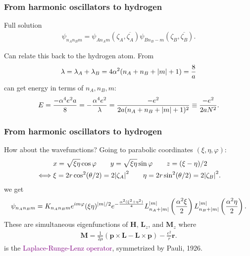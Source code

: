 \documentclass{beamer}
\theoremstyle{definition}
\newcommand{\lp}{\left(}
\newcommand{\rp}{\right)}
\newcommand{\f}[2]{\frac{#1}{#2}}
\newcommand{\al}{\alpha}
\begin{document}
\begin{frame}
\frametitle{From harmonic oscillators to hydrogen}

Full solution
\begin{align*}
\psi_{n_A n_B m} = \psi_{An_A m}\lp \zeta_A, \overline{\zeta_A}\rp \psi_{Bn_B- m}\lp \zeta_B, \overline{\zeta_B} \rp.
\end{align*}

\pause 

Can relate this back to the hydrogen atom. \pause From 
\begin{align*}
\lambda = \lambda_A + \lambda_B =  4\al^2 (n_A + n_B + \abs{m} + 1) = \f{8}{a}
\end{align*}
can get energy in terms of $n_A, n_B, m$:
\begin{align*}
E = \f{-\al^4 e^2 a}{8} = -\f{\al^4 e^2 }{\lambda} = \f{-e^2 }{2a(n_A + n_B + \abs{m} + 1)^2} \equiv \f{-e^2}{2aN^2}.
\end{align*}


\end{frame}



\begin{frame}
\frametitle{From harmonic oscillators to hydrogen}
How about the wavefunctions? 
\pause Going to parabolic coordinates $(\xi, \eta, \varphi)$:
\begin{align*}
&x = \sqrt{\xi\eta}\cos\varphi \quad\quad y = \sqrt{\xi\eta}\sin\varphi \quad\quad z = (\xi - \eta)/2\\
\iff 
&\xi = 2r\cos^2 (\theta/2) = 2\abs{\zeta_A}^2  \quad\quad \eta = 2r\sin^2 (\theta/2) = 2\abs{\zeta_B}^2. 
\end{align*}
\pause
we get
\begin{align*}
\psi_{n_A n_B m} = K_{n_An_B m} e^{im\varphi} (\xi \eta)^{\abs{m}/2}  e^{ -\f{\al^2(\xi^2 + \eta^2)}{4}}
L_{n_A + \abs{m}}^{\abs{m}} \lp\f{\al^2 \xi}{2} \rp
L_{n_B + \abs{m}}^{\abs{m}} \lp\f{\al^2 \eta}{2} \rp.
\end{align*}
\pause 
These are simultaneous eigenfunctions of $\mathbf{H}$, 
\pause $\mathbf{L}_z$, 
\pause and $\mathbf{M}_z$ where
\begin{align*}
\mathbf{M} = \f{1}{2\mu} (\mathbf{p}\times \mathbf{L} - \mathbf{L}\times \mathbf{p}) - \f{e^2}{r} \mathbf{r}.
\end{align*}
is the \textcolor{purple}{Laplace-Runge-Lenz operator}, symmetrized by Pauli, 1926.

\end{frame}
\end{document}
